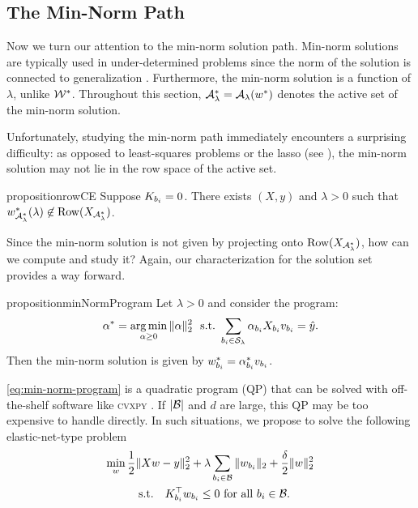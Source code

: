 \subsection{The Min-Norm Path}\label{sec:min-norm}

Now we turn our attention to the min-norm solution path.
Min-norm solutions are typically used in under-determined problems since the
norm of the solution is connected to generalization
\citep{neyshabur2015bias, gunasekar2017implicit}.
Furthermore, the min-norm solution is
a function of \( \lambda \), unlike \( \mathcal{W}^* \).
Throughout this section, \( {\mathcal{A}_{\lambda}^{*}} = {\mathcal{A}_{\lambda}}(w^*) \) denotes
the active set of the min-norm solution.

Unfortunately, studying the min-norm path immediately encounters a
surprising difficulty:
as opposed to least-squares problems or the lasso (see \citet{tibshirani2013unique}),
the min-norm solution may not lie in the row space of the active set.

\begin{restatable}{proposition}{rowCE}\label{prop:row-ce}
    Suppose \( K_{{b_i}} = 0 \).
    There exists \( (X, y) \) and
    \( \lambda > 0 \) such that
    \( w^*_{\mathcal{A}_{\lambda}^{*}}(\lambda) \not \in \text{Row}(X_{\mathcal{A}_{\lambda}^{*}}) \).
\end{restatable}

Since the min-norm solution is not given by projecting onto \( \text{Row}(X_{\mathcal{A}_{\lambda}^{*}}) \),
how can we compute and study it?
Again, our characterization for the solution set provides a way forward.

\begin{restatable}{proposition}{minNormProgram}\label{prop:min-norm-program}
    Let \( \lambda > 0 \)
    and consider the program:
    \begin{equation}\label{eq:min-norm-program}
        \begin{aligned}
            \alpha^* = \mathop{\rm arg\,min}_{\alpha \geq 0} \|\alpha\|_2^2
            \, \, \text{ s.t.} \, \,
            \sum_{{b_i} \in \mathcal{S}_\lambda} \alpha_{{b_i}} X_{b_i} v_{b_i} = \hat y.
        \end{aligned}
    \end{equation}
    Then the min-norm solution is given by
    \( w^*_{b_i} = \alpha^*_{b_i} v_{b_i} \).
\end{restatable}

\cref{eq:min-norm-program} is a quadratic program (QP) that can be solved with
off-the-shelf software like \textsc{cvxpy} \citep{diamond2016cvxpy}.
If \( |\mathcal{B}| \) and \( d \) are large, this QP may be too expensive to handle directly.
In such situations, we propose to solve the following elastic-net-type problem
\begin{equation}\label{eq:l2-penalized-cgl}
    \begin{aligned}
        \min_{w} \,
         & \frac 1 2 \|X w - y\|_2^2 + \lambda \sum_{{b_i} \in \mathcal{B}} \|w_{b_i}\|_2
        + \frac{\delta}{2} \|w\|_2^2                                                 \\
         & \quad \text{s.t.} \quad K_{{b_i}}^\top w_{b_i} \leq 0  \text{ for all } {b_i} \in \mathcal{B}.
    \end{aligned}
\end{equation}

